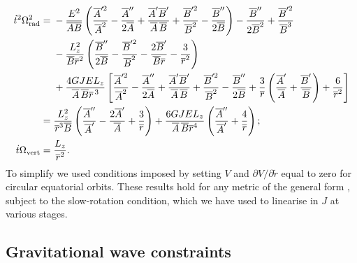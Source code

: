 \begin{align}
\dot{t}^2\Omega_\mathrm{rad}^2 = {} & -\frac{E^2}{\overline{A}\overline{B}} \left( \frac{\overline{A}'^2}{\overline{A}^2} - \frac{\overline{A}''}{2\overline{A}} + \frac{\overline{A}'\overline{B}'}{\overline{A}\,\overline{B}} + \frac{\overline{B}'^2}{\overline{B}^2} - \frac{\overline{B}''}{2\overline{B}} \right) - \frac{\overline{B}''}{2\overline{B}^2} +  \frac{\overline{B}'^2}{\overline{B}^3} \nonumber \\*
 & - {} \frac{L_z^2}{\overline{B}\overline{r}^2} \left(\frac{\overline{B}''}{2\overline{B}} - \frac{\overline{B}'^2}{\overline{B}^2} - \frac{2\overline{B}'}{\overline{B}\overline{r}}-\frac{3}{\overline{r}^2} \right) \nonumber \\
  & + \frac{4GJEL_z}{\overline{A}\,\overline{B}\overline{r}^{\,3}} \left[ \frac{\overline{A}'^2}{\overline{A}^2} - \frac{\overline{A}''}{2\overline{A}} + \frac{\overline{A}'\overline{B}'}{\overline{A}\,\overline{B}} + \frac{\overline{B}'^2}{\overline{B}^2} - \frac{\overline{B}''}{2\overline{B}} + \frac{3}{\overline{r}}\left(\frac{\overline{A}'}{\overline{A}}+\frac{\overline{B}'}{\overline{B}}\right) + \frac{6}{\overline{r}^2}\right] \label{eq:long_epi} \\
 = {} &  \frac{L_z^2}{\overline{r}^3\overline{B}}\left(\frac{\overline{A}''}{\overline{A}'} - \frac{2\overline{A}'}{\overline{A}} + \frac{3}{\overline{r}}\right) +\frac{6GJEL_z}{\overline{A}\,\overline{B} \overline{r}^4} \left(\frac{\overline{A}''}{\overline{A}'} + \frac{4}{\overline{r}}\right); \\
\dot{t}\Omega_\mathrm{vert} = {} & \frac{L_z}{\overline{r}^2}.
\end{align}
To simplify  we used conditions imposed by setting $V$ and $\partial V/\partial \widetilde{r}$ equal to zero for circular equatorial orbits. These results hold for any metric of the general form , subject to the slow-rotation condition, which we have used to linearise in $J$ at various stages.

\subsection{Gravitational wave constraints}\label{sec:GW-f-R}

